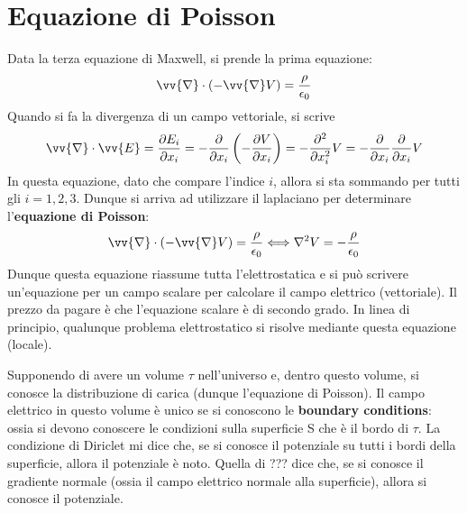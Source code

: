 \documentclass[a4paper, oneside]{article}
\begin{document}
\section{Equazione di Poisson}
Data la terza equazione di Maxwell, si prende la prima equazione:
\begin{gather*}
    \vv{\nabla} \cdot (-\vv{\nabla}V ) = \frac{\rho}{\epsilon_0}  
\end{gather*} 
Quando si fa la divergenza di un campo vettoriale, si scrive
\begin{gather*}
    \vv{\nabla} \cdot \vv{E} = \frac{\partial E_i}{\partial x_i} = -\frac{\partial }{\partial x_i} \left(- \frac{\partial V}{\partial x_i} \right) = -\frac{\partial ^{2}}{\partial x_i^{2} }V = - \frac{\partial }{\partial x_i} \frac{\partial }{\partial x_i} V  
\end{gather*}
In questa equazione, dato che compare l'indice $i$, allora si sta sommando per tutti gli $i = 1, 2, 3$. Dunque si arriva ad 
utilizzare il laplaciano per determinare l'\textbf{equazione di Poisson}:
\begin{align}
    \vv{\nabla} \cdot (-\vv{\nabla}V ) = \frac{\rho}{\epsilon_0} \Longleftrightarrow \nabla^{2}V = - \frac{\rho}{\epsilon_0} 
\end{align}
Dunque questa equazione riassume tutta l'elettrostatica e si può scrivere un'equazione 
per un campo scalare per calcolare il campo elettrico (vettoriale). Il prezzo da pagare
è che l'equazione scalare è di secondo grado. In linea di principio, qualunque problema 
elettrostatico si risolve mediante questa equazione (locale).
\begin{theorem}
    Supponendo di avere un volume $\tau$ nell'universo e, dentro questo 
    volume, si conosce la distribuzione di carica (dunque l'equazione di Poisson). 
    Il campo elettrico in questo volume è unico se si conoscono le 
    \textbf{boundary conditions}: ossia si devono conoscere le condizioni 
    sulla superficie S che è il bordo di $\tau$. La condizione di Diriclet mi dice che,
    se si conosce il potenziale su tutti i bordi della superficie, allora il potenziale è noto.
    Quella di ??? dice che, se si conosce il gradiente normale (ossia il campo elettrico 
    normale alla superficie), allora si conosce il potenziale.
\end{theorem}
\end{document}
